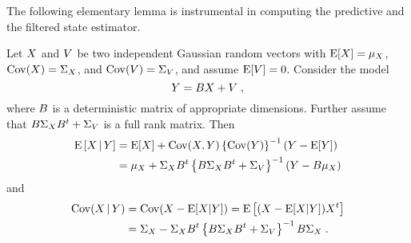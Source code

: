 The following elementary lemma is instrumental in computing the predictive and the filtered state estimator.

\begin{prop}
  \label{prop:cond:linear_gauss_mod}
Let $X$ and $V$ be two independent Gaussian random vectors with $\operatorname{E}[X] = \mu_X$, $\operatorname{Cov}(X) = \Sigma_{X}$, and $\operatorname{Cov}(V)= \Sigma_{V}$, and assume $\operatorname{E}[V]= 0$. Consider the model
\begin{equation}
\label{eq:model-equation-linear-gauss}
  Y = B X + V \; ,
\end{equation}
where $B$ is a deterministic matrix of appropriate dimensions. Further assume that $B \Sigma_{X} B^t+ \Sigma_{V}$ is a full
rank matrix. Then
\begin{align}
  \label{eq:post_mean:Gaussian}
   \operatorname{E}\left[ X \,|\, Y\right] &= \operatorname{E}[X] + \operatorname{Cov}(X,Y) \left \{ \operatorname{Cov}(Y) \right \}^{-1} (Y - \operatorname{E}[Y]) \\
                              &= \mu_{X} + \Sigma_{X} B^t \left \{ B \Sigma_{X} B^t + \Sigma_V \right \}^{-1} (Y - B \mu_{X}) \nonumber
\end{align}
and
\begin{align}
  \label{eq:post_cov:Gaussian}
   \operatorname{Cov}(X \,|\, Y) &= \operatorname{Cov}(X - \operatorname{E}[ X | Y]) = \operatorname{E} \left[ (X - \operatorname{E}[ X | Y])X^t \right] \\
                   &= \Sigma_{X} - \Sigma_{X} B^t \left \{ B \Sigma_{X} B^t + \Sigma_{V} \right \}^{-1} B \Sigma_{X} \; . \nonumber
\end{align}
\end{prop}

